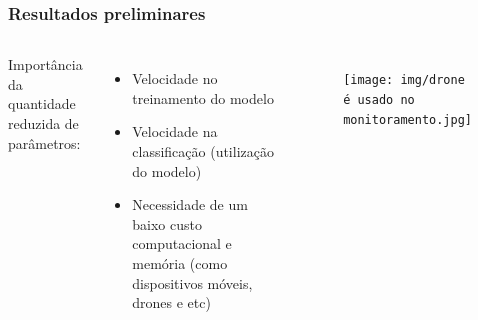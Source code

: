 \documentclass[aspectratio=169]{beamer}
\begin{document}










\begin{frame}
    \frametitle{Resultados preliminares}



    \begin{columns}




        Importância da quantidade reduzida de parâmetros:
        \begin{itemize}
            \item Velocidade no treinamento do modelo
            \item Velocidade na classificação (utilização do modelo)
            \item Necessidade de um baixo custo computacional e memória (como dispositivos móveis, drones e etc)
        \end{itemize}


        \begin{figure}
            \centering
            \texttt{[image: img/drone é usado no monitoramento.jpg]}
            \label{fig:entelabel}
        \end{figure}


    \end{columns}

\end{frame}








\end{document}
